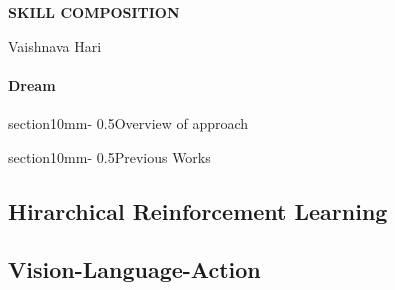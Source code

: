 \documentclass[11pt,a4paper]{article}
\makeatletter
\renewcommand{\section}{\@startsection%
{section}{1}{0mm}{-\baselineskip}%
{0.5\baselineskip}{\normalfont\Large\bfseries}}%
\makeatother
\begin{document}


\pagestyle{plain}

\begin{center} 
\bfseries\uppercase{Skill composition}
\end{center}
\vspace{-0.3cm}
\centerline{{Vaishnava Hari}}


\paragraph{Dream}
    

\section{Overview of approach}
    
\section{Previous Works}
    \subsection{Hirarchical Reinforcement Learning}
        

    \subsection{Vision-Language-Action}
        

%     

%     

%     



\end{document}
